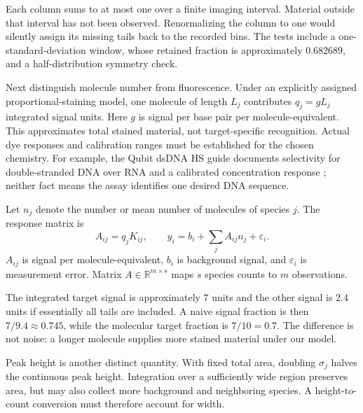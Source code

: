 Each column sums to at most one over a finite imaging interval. Material outside that interval has not been observed. Renormalizing the column to one would silently assign its missing tails back to the recorded bins. The tests include a one-standard-deviation window, whose retained fraction is approximately $0.682689$, and a half-distribution symmetry check.

Next distinguish molecule number from fluorescence. Under an explicitly assigned proportional-staining model, one molecule of length $L_j$ contributes $q_j=gL_j$ integrated signal units. Here $g$ is signal per base pair per molecule-equivalent. This approximates total stained material, not target-specific recognition. Actual dye responses and calibration ranges must be established for the chosen chemistry. For example, the Qubit dsDNA HS guide documents selectivity for double-stranded DNA over RNA and a calibrated concentration response \cite{ThermoQubit}; neither fact means the assay identifies one desired DNA sequence.

Let $n_j$ denote the number or mean number of molecules of species $j$. The response matrix is
\begin{equation}
A_{ij}=q_jK_{ij},\qquad
y_i=b_i+\sum_j A_{ij}n_j+\varepsilon_i. \label{eq:forward}
\end{equation}
$A_{ij}$ is signal per molecule-equivalent, $b_i$ is background signal, and $\varepsilon_i$ is measurement error. Matrix $A\in\mathbb R^{m\times s}$ maps $s$ species counts to $m$ observations.


The integrated target signal is approximately $7$ units and the other signal is $2.4$ units if essentially all tails are included. A naive signal fraction is then $7/9.4\approx0.745$, while the molecular target fraction is $7/10=0.7$. The difference is not noise: a longer molecule supplies more stained material under our model.

Peak height is another distinct quantity. With fixed total area, doubling $\sigma_j$ halves the continuous peak height. Integration over a sufficiently wide region preserves area, but may also collect more background and neighboring species. A height-to-count conversion must therefore account for width.

